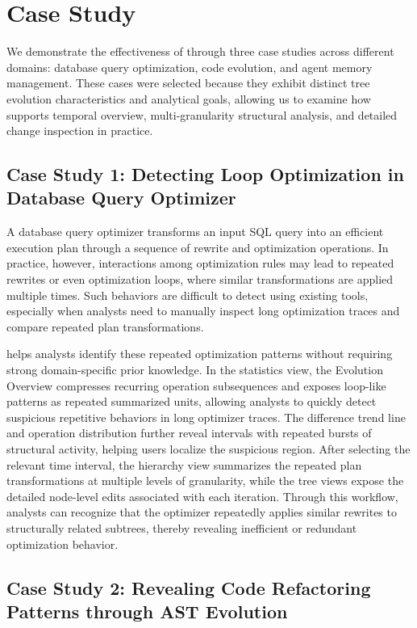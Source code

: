 \section{Case Study}
\label{sec:case_study}

We demonstrate the effectiveness of \sysname{} through three case studies across different domains: database query optimization, code evolution, and agent memory management. These cases were selected because they exhibit distinct tree evolution characteristics and analytical goals, allowing us to examine how \sysname{} supports temporal overview, multi-granularity structural analysis, and detailed change inspection in practice.

\subsection{Case Study 1: Detecting Loop Optimization in Database Query Optimizer}

A database query optimizer transforms an input SQL query into an efficient execution plan through a sequence of rewrite and optimization operations. In practice, however, interactions among optimization rules may lead to repeated rewrites or even optimization loops, where similar transformations are applied multiple times. Such behaviors are difficult to detect using existing tools, especially when analysts need to manually inspect long optimization traces and compare repeated plan transformations.

\sysname{} helps analysts identify these repeated optimization patterns without requiring strong domain-specific prior knowledge. In the statistics view, the Evolution Overview compresses recurring operation subsequences and exposes loop-like patterns as repeated summarized units, allowing analysts to quickly detect suspicious repetitive behaviors in long optimizer traces. The difference trend line and operation distribution further reveal intervals with repeated bursts of structural activity, helping users localize the suspicious region. After selecting the relevant time interval, the hierarchy view summarizes the repeated plan transformations at multiple levels of granularity, while the tree views expose the detailed node-level edits associated with each iteration. Through this workflow, analysts can recognize that the optimizer repeatedly applies similar rewrites to structurally related subtrees, thereby revealing inefficient or redundant optimization behavior.

\subsection{Case Study 2: Revealing Code Refactoring Patterns through AST Evolution}

